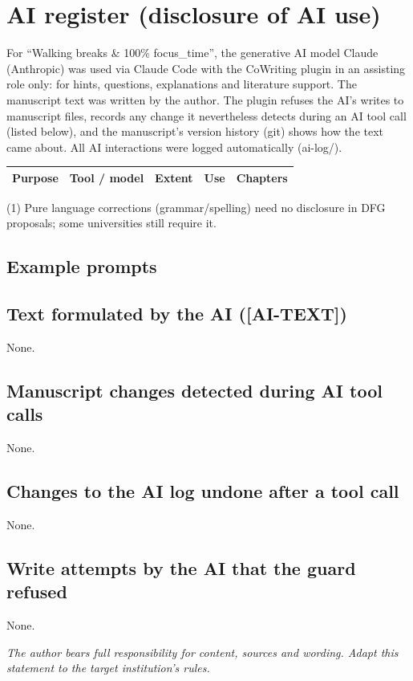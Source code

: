 \section*{AI register (disclosure of AI use)}

For “Walking breaks \& 100\% focus\_time”, the generative AI model Claude (Anthropic) was used via Claude Code with the CoWriting plugin in an assisting role only: for hints, questions, explanations and literature support. The manuscript text was written by the author. The plugin refuses the AI's writes to manuscript files, records any change it nevertheless detects during an AI tool call (listed below), and the manuscript's version history (git) shows how the text came about. All AI interactions were logged automatically (ai-log/).

\begin{tabular}{p{.22\linewidth}p{.18\linewidth}p{.2\linewidth}p{.2\linewidth}p{.1\linewidth}}
\hline
\textbf{Purpose} & \textbf{Tool / model} & \textbf{Extent} & \textbf{Use} & \textbf{Chapters} \\
\hline
\hline
\end{tabular}

\noindent(1) Pure language corrections (grammar/spelling) need no disclosure in DFG proposals; some universities still require it.

\subsection*{Example prompts}
\begin{itemize}
\end{itemize}
\subsection*{Text formulated by the AI ([AI-TEXT])}
None.
\subsection*{Manuscript changes detected during AI tool calls}
None.
\subsection*{Changes to the AI log undone after a tool call}
None.
\subsection*{Write attempts by the AI that the guard refused}
None.

\textit{The author bears full responsibility for content, sources and wording. Adapt this statement to the target institution's rules.}
